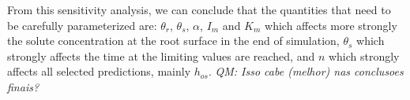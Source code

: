 {\tred From this sensitivity analysis, we can conclude that the quantities that need to be carefully parameterized are: $\theta_r$, $\theta_s$, $\alpha$, $I_m$ and $K_m$ which affects more strongly the solute concentration at the root surface in the end of simulation, $\theta_s$ which strongly affects the time at the limiting values are reached, and $n$ which strongly affects all selected predictions, mainly $h_{os}$. {\it QM: Isso cabe (melhor) nas conclusoes finais?}}



{\tred
}

